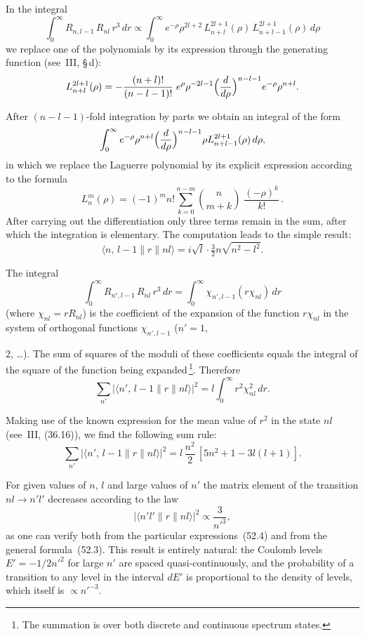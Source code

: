 In the integral
\[
\int_0^\infty R_{n,l-1}\,R_{nl}\,r^3\,dr \propto \int_0^\infty e^{-\rho}\rho^{2l+2}\,L^{2l+1}_{n+l}(\rho)\,L^{2l+1}_{n+l-1}(\rho)\,d\rho
\]
we replace one of the polynomials by its expression through the generating function (see~III, \S\,d):
\[
L^{2l+1}_{n+l}(\rho) = -\frac{(n+l)!}{(n-l-1)!}\;e^\rho\rho^{-2l-1}\Bigl(\frac{d}{d\rho}\Bigr)^{n-l-1}e^{-\rho}\rho^{n+l}.
\]

After $(n - l - 1)$-fold integration by parts we obtain an integral of the form
\[
\int_0^\infty e^{-\rho}\rho^{n+l}\Bigl(\frac{d}{d\rho}\Bigr)^{n-l-1}\rho L^{2l+1}_{n+l-1}(\rho)\,d\rho,
\]
in which we replace the Laguerre polynomial by its explicit expression according to the formula
\[
L^m_n(\rho) = (-1)^m n!\sum_{k=0}^{n-m}\binom{n}{m+k}\;\frac{(-\rho)^k}{k!}\,.
\]
After carrying out the differentiation only three terms remain in the sum, after which the integration is elementary. The computation leads to the simple result:
\begin{equation}
\langle n,\,l-1\|r\|nl\rangle = i\sqrt{l}\cdot\tfrac{3}{2}n\sqrt{n^2 - l^2}.
\tag{52.6}
\end{equation}

The integral
\[
\int_0^\infty R_{n',l-1}\,R_{nl}\,r^3\,dr = \int_0^\infty\chi_{n',l-1}(r\chi_{nl})\,dr
\]
(where $\chi_{nl} = rR_{nl}$) is the coefficient of the expansion of the function $r\chi_{nl}$ in the system of orthogonal functions $\chi_{n',l-1}$ ($n' = 1$,

$2$, \ldots). The sum of squares of the moduli of these coefficients equals the integral of the square of the function being expanded\,\footnote{The summation is over both discrete and continuous spectrum states.}. Therefore
\begin{equation}
\sum_{n'}|\langle n',\,l-1\|r\|nl\rangle|^2 = l\int_0^\infty r^2\chi^2_{nl}\,dr.
\tag{52.7}
\end{equation}

Making use of the known expression for the mean value of $r^2$ in the state $nl$ (see~III, (36.16)), we find the following sum rule:
\begin{equation}
\sum_{n'}|\langle n',\,l-1\|r\|nl\rangle|^2 = l\,\frac{n^2}{2}\,[5n^2 + 1 - 3l(l+1)].
\tag{52.8}
\end{equation}

For given values of $n$, $l$ and large values of $n'$ the matrix element of the transition $nl \to n'l'$ decreases according to the law
\begin{equation}
|\langle n'l'\|r\|nl\rangle|^2 \propto \frac{3}{n'^3},
\tag{52.9}
\end{equation}
as one can verify both from the particular expressions~(52.4) and from the general formula~(52.3). This result is entirely natural: the Coulomb levels $E' = -1/2n'^2$ for large $n'$ are spaced quasi-continuously, and the probability of a transition to any level in the interval $dE'$ is proportional to the density of levels, which itself is $\propto n'^{-3}$.

